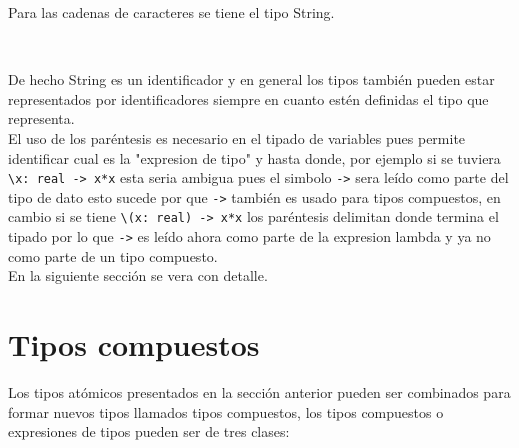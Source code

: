       Para las cadenas de caracteres se tiene el tipo String.
      
      \begin{fxcode}
         \\
      \end{fxcode}
      
      De hecho String es un identificador y en general los tipos también pueden estar representados por identificadores siempre en cuanto estén definidas el tipo que representa.
      \\
      
      El uso de los paréntesis es necesario en el tipado de variables pues permite identificar cual es la "expresion de tipo" y hasta donde, por ejemplo si se tuviera \texttt{\textbackslash x: real ->~x*x} esta seria ambigua pues el simbolo \texttt{->} sera leído como parte del tipo de dato esto sucede por que \texttt{->} también es usado para tipos compuestos, en cambio si se tiene \texttt{\textbackslash(x: real) ->~x*x} los paréntesis delimitan donde termina el tipado por lo que \texttt{->} es leído ahora como parte de la expresion lambda y ya no como parte de un tipo compuesto.
      \\
      
      En la siguiente sección se vera con detalle.
      
   \section{Tipos compuestos}
      Los tipos atómicos presentados en la sección anterior pueden ser combinados para formar nuevos tipos llamados tipos compuestos, los tipos compuestos o expresiones de tipos pueden ser de tres clases:
      
